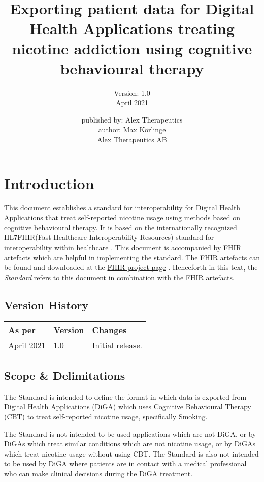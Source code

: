 \documentclass{report}
\title{Exporting patient data for Digital Health Applications treating nicotine addiction using cognitive behavioural therapy \vspace{2cm}}
\author{Version: 1.0 \\ April 2021 \\ \vspace{6cm}}
\date{published by: Alex Therapeutics \\ author: Max Körlinge \\ \textcopyright  Alex Therapeutics AB}
\newcommand{\fhir}{FHIR\textsuperscript{\textregistered}}
\newcommand{\hl}{HL7\textsuperscript{\textregistered}}
\begin{document}
\maketitle
\tableofcontents

\chapter{Introduction}
\label{ch:intro}

This document establishes a standard for interoperability for Digital Health Applications that treat self-reported nicotine usage using methods based on cognitive behavioural therapy. It is based on the internationally recognized \hl \fhir (Fast Healthcare Interoperability Resources) standard for interoperability 
within healthcare \cite{FHIR}. This document is accompanied by FHIR artefacts which are helpful in implementing the standard. The FHIR artefacts can be found and downloaded at the \href{https://simplifier.net/treat-nicotine-usage-diga}{FHIR project page} \cite{project}.
Henceforth in this text, the \textit{Standard} refers to this document in combination with the FHIR artefacts.

\section{Version History}
\begin{table}[H]
    \begin{tabular}{@{}lll@{}}
    \textbf{As per}                 & \textbf{Version}         & \textbf{Changes} \\ \midrule
    \multicolumn{1}{l|}{April 2021} & \multicolumn{1}{l|}{1.0} & Initial release. \\ \bottomrule
    \end{tabular}
    \label{tab:version}
    \end{table}

\section{Scope \& Delimitations}

The Standard is intended to define the format in which data is exported from Digital Health Applications (DiGA) which uses Cognitive Behavioural Therapy (CBT) to treat self-reported nicotine usage, specifically Smoking.

The Standard is not intended to be used applications which are not DiGA, or by DiGAs which treat similar conditions which are not nicotine usage, or by DiGAs which treat nicotine usage without using CBT. 
The Standard is also not intended to be used by DiGA where patients are in contact with a medical professional who can make clinical decisions during the DiGA treatment.
\end{document}
